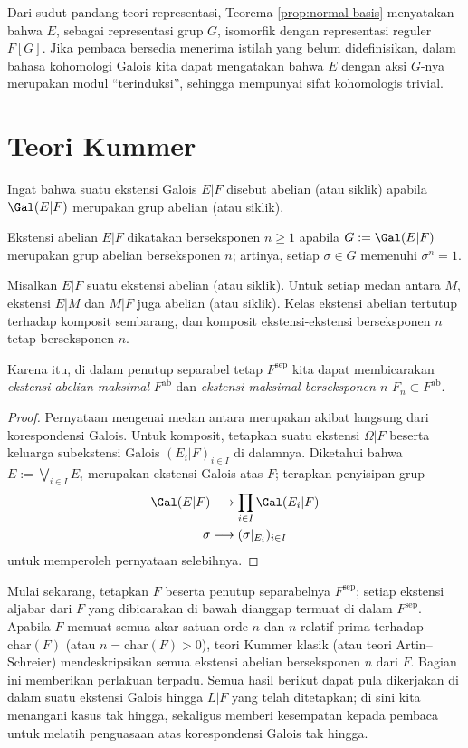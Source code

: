 Dari sudut pandang teori representasi, Teorema \ref{prop:normal-basis} menyatakan bahwa $E$, sebagai representasi grup $G$, isomorfik dengan representasi reguler $F[G]$. Jika pembaca bersedia menerima istilah yang belum didefinisikan, dalam bahasa kohomologi Galois kita dapat mengatakan bahwa $E$ dengan aksi $G$-nya merupakan modul ``terinduksi'', sehingga mempunyai sifat kohomologis trivial.

\section{Teori Kummer}\label{sec:Kummer-theory}
Ingat bahwa suatu ekstensi Galois $E|F$ disebut abelian (atau siklik) apabila $\Gal(E|F)$ merupakan grup abelian (atau siklik).

\begin{convention}
	Ekstensi abelian $E|F$ dikatakan berseksponen $n \geq 1$ apabila $G := \Gal(E|F)$ merupakan grup abelian berseksponen $n$; artinya, setiap $\sigma \in G$ memenuhi $\sigma^n = 1$.
\end{convention}

\begin{proposition}
	Misalkan $E|F$ suatu ekstensi abelian (atau siklik). Untuk setiap medan antara $M$, ekstensi $E|M$ dan $M|F$ juga abelian (atau siklik). Kelas ekstensi abelian tertutup terhadap komposit sembarang, dan komposit ekstensi-ekstensi berseksponen $n$ tetap berseksponen $n$.
\end{proposition}
Karena itu, di dalam penutup separabel tetap $F^\text{sep}$ kita dapat membicarakan \emph{ekstensi abelian maksimal} $F^\text{ab}$ dan \emph{ekstensi maksimal berseksponen $n$} $F_n\subset F^\text{ab}$.
\begin{proof}
	Pernyataan mengenai medan antara merupakan akibat langsung dari korespondensi Galois. Untuk komposit, tetapkan suatu ekstensi $\Omega|F$ beserta keluarga subekstensi Galois $(E_i|F)_{i \in I}$ di dalamnya. Diketahui bahwa $E := \bigvee_{i \in I} E_i$ merupakan ekstensi Galois atas $F$; terapkan penyisipan grup
	\begin{align*}
		\Gal(E|F) & \longrightarrow \prod_{i \in I} \Gal(E_i|F) \\
		\sigma & \longmapsto (\sigma|_{E_i})_{i \in I}
	\end{align*}
	untuk memperoleh pernyataan selebihnya.
\end{proof}

Mulai sekarang, tetapkan $F$ beserta penutup separabelnya $F^\text{sep}$; setiap ekstensi aljabar dari $F$ yang dibicarakan di bawah dianggap termuat di dalam $F^\text{sep}$. Apabila $F$ memuat semua akar satuan orde $n$ dan $n$ relatif prima terhadap $\text{char}(F)$ (atau $n = \text{char}(F) > 0$), teori Kummer klasik (atau teori Artin--Schreier) mendeskripsikan semua ekstensi abelian berseksponen $n$ dari $F$. Bagian ini memberikan perlakuan terpadu. Semua hasil berikut dapat pula dikerjakan di dalam suatu ekstensi Galois hingga $L|F$ yang telah ditetapkan; di sini kita menangani kasus tak hingga, sekaligus memberi kesempatan kepada pembaca untuk melatih penguasaan atas korespondensi Galois tak hingga.

